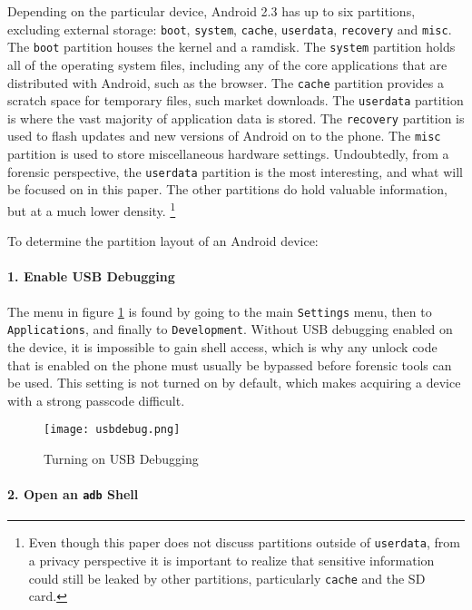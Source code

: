 Depending on the particular device, Android 2.3 has up to six partitions, excluding external storage: \texttt{boot}, \texttt{system}, \texttt{cache}, \texttt{userdata},
\texttt{recovery} and \texttt{misc}. 
The \texttt{boot} partition houses the kernel and a ramdisk.
The \texttt{system} partition holds all of the operating system files, including any of the core applications that are distributed with Android, such as the browser. 
The \texttt{cache} partition provides a scratch space for temporary files, such market downloads.
The \texttt{userdata} partition is where the vast majority of application data is stored.
The \texttt{recovery} partition is used to flash updates and new versions of Android on to the phone. 
The \texttt{misc} partition is used to store miscellaneous hardware settings.
Undoubtedly, from a forensic perspective, the \texttt{userdata} partition is the most interesting, and what will be focused on in
this paper. The other partitions do hold valuable information, but at a much lower density.
\footnote{Even though this paper does not discuss partitions outside of \texttt{userdata}, from a privacy perspective it is
important to realize that sensitive information could still be leaked by other partitions, particularly \texttt{cache} and the SD
card.}

To determine the partition layout of an Android device:

\paragraph {1. 
Enable USB Debugging} The menu in figure \ref{fig:usbdebug} is found by going to the main \texttt{Settings} menu, then to
\texttt{Applications}, and finally to \texttt{Development}.  Without USB debugging enabled on the device, it is impossible to gain
shell access, which is why any unlock code that is enabled on the phone must usually be bypassed before forensic tools can be used.
This setting is not turned on by default, which makes acquiring a device with a strong passcode difficult.

\begin{figure}[ht]
\caption{Turning on USB Debugging}
\begin{center}\texttt{[image: usbdebug.png]}\end{center}
\label{fig:usbdebug}
\end{figure}

\paragraph {2. Open an \texttt{adb}  Shell}

